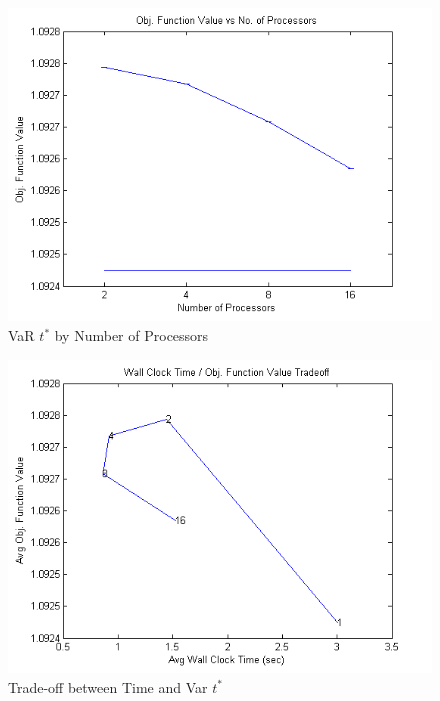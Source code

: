 \documentclass[12pt]{article}
\begin{document}
\begin{figure}[ht]
	\centering
		\includegraphics{../plot/figs/objfnval_num_proc.png}
	\caption{VaR $t^*$ by Number of Processors}
	\label{fig:objfnval_num_proc}
\end{figure}

\begin{figure}[ht]
	\centering
		\includegraphics{../plot/figs/wct_objfnval_frontier.png}
	\caption{Trade-off between Time and Var $t^*$}
	\label{fig:wct_objfnval_frontier}
\end{figure}
\end{document}

